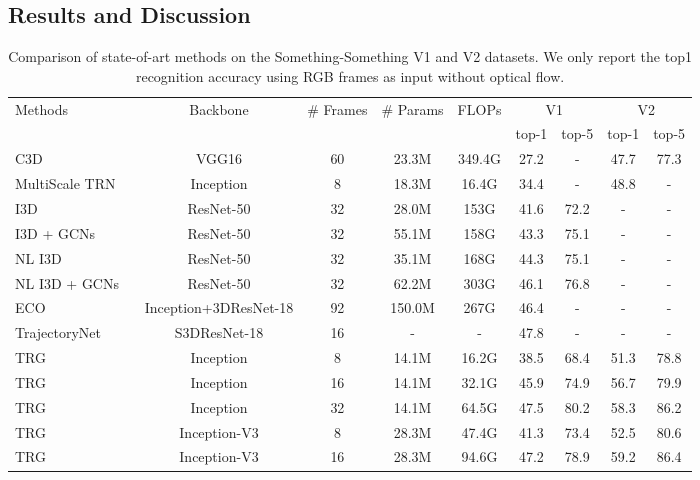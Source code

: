 \documentclass[conference,compsoc]{IEEEtran}
\begin{document}
    
\subsection{Results and Discussion}

    \begin{table*}[!htb]
\caption{Comparison of state-of-art methods on the Something-Something V1 and V2 datasets. We only report the top1 recognition accuracy using RGB frames as input without optical flow.}
        \begin{center}
        \begin{tabular}{lcccccccc}
        \toprule
         \multirow{2}{*}{Methods} & \multirow{2}{*}{Backbone}&  \multirow{2}{*}{\# Frames}& \multirow{2}{*}{\# Params}& \multirow{2}{*}{FLOPs}& \multicolumn{2}{c}{V1} & \multicolumn{2}{c}{V2}\\
         & & & & & top-1 & top-5 & top-1 & top-5\\
         \midrule
         C3D \cite{goyal2017something} ~ & VGG16 & 60 & 23.3M & 349.4G & 27.2 & - & 47.7 & 77.3\\
         MultiScale TRN \cite{zhou2018temporal} ~& Inception & 8 & 18.3M & 16.4G & 34.4 &- & 48.8 &- \\
         I3D~\cite{wang2018videos} & ResNet-50 & 32 & 28.0M & 153G & 41.6 & 72.2 & - & -  \\
         I3D + GCNs \cite{wang2018videos}  ~& ResNet-50 & 32 & 55.1M & 158G & 43.3 &  75.1 &- &-  \\
         NL I3D \cite{wang2018videos}  ~& ResNet-50 & 32 & 35.1M & 168G & 44.3 &  75.1 &- &-  \\
         NL I3D + GCNs \cite{wang2018videos}  ~& ResNet-50 & 32 & 62.2M & 303G & 46.1 &  76.8 &- &-  \\
         ECO \cite{zolfaghari2018eco:} ~& Inception+3DResNet-18 & 92 & 150.0M & 267G & 46.4 & - &- &- \\
         TrajectoryNet \cite{zhao2018trajectory} ~ & S3DResNet-18 & 16 & - & - & 47.8 & - &- &-\\ \hline
         TRG~ & Inception & 8 & 14.1M & 16.2G & 38.5 & 68.4 & 51.3 &78.8 \\
         TRG~ & Inception & 16 & 14.1M & 32.1G & 45.9 & 74.9 & 56.7 &79.9 \\
         TRG~ & Inception & 32 & 14.1M & 64.5G &  47.5 & 80.2 & 58.3 & 86.2 \\
         TRG~ & Inception-V3 & 8 & 28.3M & 47.4G & 41.3 & 73.4 & 52.5 & 80.6 \\
         TRG~ & Inception-V3 & 16 & 28.3M & 94.6G & 47.2 & 78.9 & 59.2 & 86.4 \\

\end{tabular}
\end{center}
\end{table*}
\end{document}
